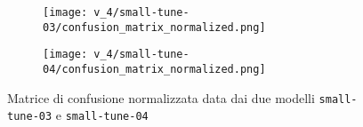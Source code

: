     \begin{figure}[!htb]
        \centering
        \begin{subfigure}{.49\textwidth}
            \texttt{[image: v\_4/small-tune-03/confusion\_matrix\_normalized.png]}
            \label{fig:v4-4.1}
        \end{subfigure}
        \begin{subfigure}{.49\textwidth}
            \texttt{[image: v\_4/small-tune-04/confusion\_matrix\_normalized.png]}
            \label{fig:v4-4.2}
        \end{subfigure}
        \caption{Matrice di confusione normalizzata data dai due modelli \texttt{small-tune-03} e \texttt{small-tune-04}}
        \label{fig:v4-4}
    \end{figure}

